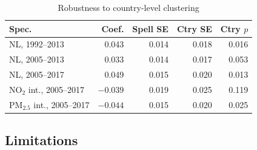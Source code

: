 \documentclass[9pt,twocolumn,twoside]{pnas-new}
\begin{document}
\begin{table}[t]
\centering
\caption{Robustness to country-level clustering}
\small
\begin{tabular*}{\columnwidth}{@{\extracolsep{\fill}}lrrrr}
Spec. & Coef. & Spell SE & Ctry SE & Ctry $p$ \\
\midrule
NL, 1992--2013 & 0.043 & 0.014 & 0.018 & 0.016 \\
NL, 2005--2013 & 0.033 & 0.014 & 0.017 & 0.053 \\
NL, 2005--2017 & 0.049 & 0.015 & 0.020 & 0.013 \\
NO$_2$ int., 2005--2017 & $-0.039$ & 0.019 & 0.025 & 0.119 \\
PM$_{2.5}$ int., 2005--2017 & $-0.044$ & 0.015 & 0.020 & 0.025 \\
\bottomrule
\end{tabular*}
\label{tab:cluster-robustness}
\end{table}

\subsection*{Limitations}
\end{document}
